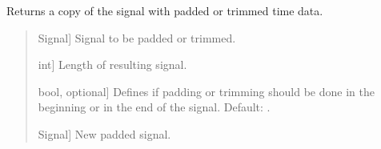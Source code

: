 \documentclass[letterpaper,10pt,english]{sphinxmanual}
\begin{document}
\begin{fulllineitems}
\label{\detokenize{modules/dsptoolbox.standard_functions:dsptoolbox.standard_functions.pad_trim}}
\pysigstartsignatures
{}
\pysigstopsignatures
\sphinxAtStartPar
Returns a copy of the signal with padded or trimmed time data.
\begin{quote}\begin{description}
\begin{description}
\sphinxlineitem{\sphinxstylestrong{signal}}{[}Signal{]}
\sphinxAtStartPar
Signal to be padded or trimmed.

\sphinxlineitem{\sphinxstylestrong{desired\_length\_samples}}{[}int{]}
\sphinxAtStartPar
Length of resulting signal.

\sphinxlineitem{\sphinxstylestrong{in\_the\_end}}{[}bool, optional{]}
\sphinxAtStartPar
Defines if padding or trimming should be done in the beginning or
in the end of the signal. Default: .

\end{description}

\begin{description}
\sphinxlineitem{\sphinxstylestrong{new\_signal}}{[}Signal{]}
\sphinxAtStartPar
New padded signal.

\end{description}

\end{description}\end{quote}

\end{fulllineitems}

\end{document}
